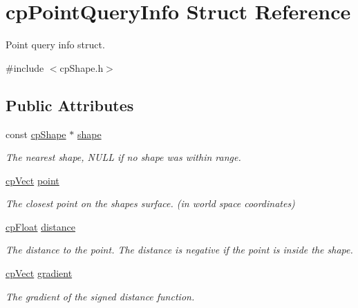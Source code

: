 \hypertarget{structcp_point_query_info}{}\section{cp\+Point\+Query\+Info Struct Reference}
\label{structcp_point_query_info}


Point query info struct.  




{\ttfamily \#include $<$cp\+Shape.\+h$>$}

\subsection*{Public Attributes}
\begin{DoxyCompactItemize}
\item 
\hypertarget{structcp_point_query_info_ad27c172fcc5ca586f60c4e9fc15560da}{}const \hyperlink{structcp_shape}{cp\+Shape} $\ast$ \hyperlink{structcp_point_query_info_ad27c172fcc5ca586f60c4e9fc15560da}{shape}\label{structcp_point_query_info_ad27c172fcc5ca586f60c4e9fc15560da}

\begin{DoxyCompactList}\small\item\em The nearest shape, N\+U\+L\+L if no shape was within range. \end{DoxyCompactList}\item 
\hypertarget{structcp_point_query_info_aa3ba52f53251ad8770c39d7789b14547}{}\hyperlink{structcp_vect}{cp\+Vect} \hyperlink{structcp_point_query_info_aa3ba52f53251ad8770c39d7789b14547}{point}\label{structcp_point_query_info_aa3ba52f53251ad8770c39d7789b14547}

\begin{DoxyCompactList}\small\item\em The closest point on the shape\textquotesingle{}s surface. (in world space coordinates) \end{DoxyCompactList}\item 
\hypertarget{structcp_point_query_info_ab7b002bf19b83cb05dd4635f92884ec8}{}\hyperlink{group__basic_types_gac1ed65573e035bf892505768c852d8d3}{cp\+Float} \hyperlink{structcp_point_query_info_ab7b002bf19b83cb05dd4635f92884ec8}{distance}\label{structcp_point_query_info_ab7b002bf19b83cb05dd4635f92884ec8}

\begin{DoxyCompactList}\small\item\em The distance to the point. The distance is negative if the point is inside the shape. \end{DoxyCompactList}\item 
\hyperlink{structcp_vect}{cp\+Vect} \hyperlink{structcp_point_query_info_a55bf2732bc2563af6c83ce1985906034}{gradient}
\begin{DoxyCompactList}\small\item\em The gradient of the signed distance function. \end{DoxyCompactList}\end{DoxyCompactItemize}


